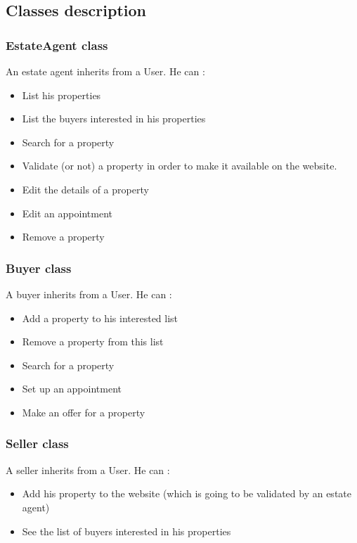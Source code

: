 \documentclass[a4paper,12pt]{article}
\begin{document}
\subsection {Classes description}

\subsubsection{EstateAgent class}
An estate agent inherits from a User.
He can :
\begin{itemize}
\item List his properties
\item List the buyers interested in his properties
\item Search for a property
\item Validate (or not) a property in order to make it available on the website.
\item Edit the details of a property
\item Edit an appointment
\item Remove a property
\end{itemize}

\subsubsection{Buyer class}
A buyer inherits from a User.
He can :
\begin{itemize}
\item Add a property to his interested list
\item Remove a property from this list
\item Search for a property
\item Set up an appointment
\item Make an offer for a property
\end{itemize}

\subsubsection{Seller class}
A seller inherits from a User.
He can :
\begin{itemize}
\item Add his property to the website (which is going to be validated by an estate agent)
\item See the list of buyers interested in his properties
\end{itemize}
\end{document}
